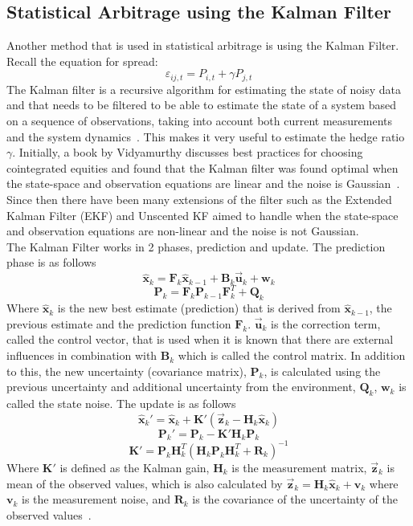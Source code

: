 \subsection{Statistical Arbitrage using the Kalman Filter}
Another method that is used in statistical arbitrage is using the Kalman Filter. Recall the equation for spread:
$$\varepsilon_{i j,t} = P_{i,t} + \gamma P_{j,t}$$
\noindent The Kalman filter is a recursive algorithm for estimating the state of noisy data and that needs to be filtered to be able to estimate the state of a system based on a sequence of observations, taking into account both current measurements and the system dynamics~\cite{ALSADIK2019299}. This makes it very useful to estimate the hedge ratio $\gamma$. Initially, a book by Vidyamurthy discusses best practices for choosing cointegrated equities and found that the Kalman filter was found optimal when the state-space and observation equations are linear and the noise is Gaussian~\cite{vidyamurthy2004pairs}. Since then there have been many extensions of the filter such as the Extended Kalman Filter (EKF) and Unscented KF aimed to handle when the state-space and observation equations are non-linear and the noise is not Gaussian.
\\[3mm]
The Kalman Filter works in 2 phases, prediction and update. The prediction phase is as follows $$\hat{\mathbf{x}}_k = \mathbf{F}_k \hat{\mathbf{x}}_{k-1} + \mathbf{B}_k \overset{\rightarrow}{\mathbf{u}}_k + \mathbf{w}_k$$ $$\mathbf{P}_k = \mathbf{F}_k \mathbf{P}_{k-1} \mathbf{F}_k^T + \mathbf{Q}_k $$ Where $\hat{\mathbf{x}}_k$ is the new best estimate (prediction) that is derived from $\hat{\mathbf{x}}_{k-1}$, the previous estimate and the prediction function $\mathbf{F}_k$. $\overset{\rightarrow}{\mathbf{u}}_k$ is the correction term, called the control vector, that is used when it is known that there are external influences in combination with $\mathbf{B}_k$ which is called the control matrix. In addition to this, the new uncertainty (covariance matrix), $\mathbf{P}_k$, is calculated using the previous uncertainty and additional uncertainty from the environment, $\mathbf{Q}_k $, $\mathbf{w}_k$ is called the state noise. The update is as follows $$\hat{\mathbf{x}}_k' = \hat{\mathbf{x}}_k + \mathbf{K}'(\overset{\rightarrow}{\mathbf{z}}_k - \mathbf{H}_k \hat{\mathbf{x}}_k)$$ $$\mathbf{P}_k' = \mathbf{P}_k - \mathbf{K}'\mathbf{H}_k \mathbf{P}_k$$ $$\mathbf{K}' = \mathbf{P}_k \mathbf{H}_k^T (\mathbf{H}_k \mathbf{P}_k \mathbf{H}_k^T + \mathbf{R}_k)^{-1}$$ Where $\mathbf{K}'$ is defined as the Kalman gain, $\mathbf{H}_k$ is the measurement matrix, $\overset{\rightarrow}{\mathbf{z}}_k$ is mean of the observed values, which is also calculated by $\overset{\rightarrow}{\mathbf{z}}_k = \mathbf{H}_k \hat{\mathbf{x}}_k + \mathbf{v}_k$ where $\mathbf{v}_k$ is the measurement noise, and $\mathbf{R}_k$ is the covariance of the uncertainty of the observed values~\cite{kalman_filter_bzarg}.
